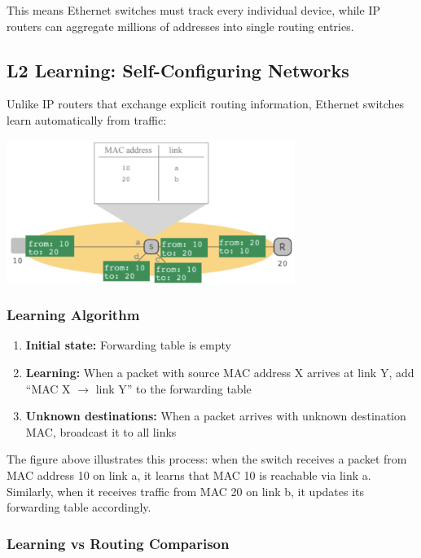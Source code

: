 \documentclass[../../compsys.tex]{subfiles}
\begin{document}
This means Ethernet switches must track every individual device, while IP routers can aggregate millions of addresses into single routing entries.

\subsection{L2 Learning: Self-Configuring Networks}

Unlike IP routers that exchange explicit routing information, Ethernet switches learn automatically from traffic:

\begin{center}
    \includegraphics[width=0.7\textwidth]{images/link-layer-switch.png}
\end{center}

\subsubsection{Learning Algorithm}
\begin{enumerate}
    \item \textbf{Initial state:} Forwarding table is empty
    \item \textbf{Learning:} When a packet with source MAC address X arrives at link Y, add ``MAC X $\rightarrow$ link Y'' to the forwarding table
    \item \textbf{Unknown destinations:} When a packet arrives with unknown destination MAC, broadcast it to all links
\end{enumerate}

The figure above illustrates this process: when the switch receives a packet from MAC address 10 on link a, it learns that MAC 10 is reachable via link a. Similarly, when it receives traffic from MAC 20 on link b, it updates its forwarding table accordingly.

\subsubsection{Learning vs Routing Comparison}
\end{document}
